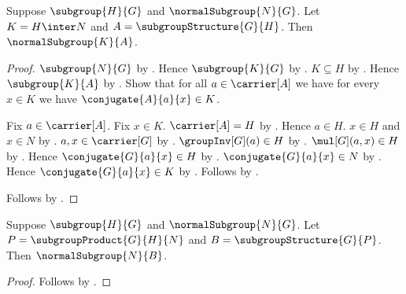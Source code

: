 \begin{theorem}\label{group_second_isomorphism_intersection_normal}
    Suppose $\subgroup{H}{G}$ and $\normalSubgroup{N}{G}$.
    Let $K=H\inter N$ and $A=\subgroupStructure{G}{H}$.
    Then $\normalSubgroup{K}{A}$.
\end{theorem}
\begin{proof}
    $\subgroup{N}{G}$ by .
    Hence $\subgroup{K}{G}$ by .
    $K\subseteq H$ by .
    Hence $\subgroup{K}{A}$ by
        .
    Show that for all $a\in\carrier[A]$ we have for every $x\in K$
        we have $\conjugate{A}{a}{x}\in K$.
    \begin{subproof}
        Fix $a\in\carrier[A]$.
        Fix $x\in K$.
        $\carrier[A]=H$ by .
        Hence $a\in H$.
        $x\in H$ and $x\in N$ by
            .
        $a,x\in\carrier[G]$ by
            .
        $\groupInv[G](a)\in H$ by .
        $\mul[G](a,x)\in H$ by .
        Hence $\conjugate{G}{a}{x}\in H$ by
            .
        $\conjugate{G}{a}{x}\in N$ by
            .
        Hence $\conjugate{G}{a}{x}\in K$ by .
        Follows by .
    \end{subproof}
    Follows by .
\end{proof}

\begin{theorem}\label{group_second_isomorphism_product_normal}
    Suppose $\subgroup{H}{G}$ and $\normalSubgroup{N}{G}$.
    Let $P=\subgroupProduct{G}{H}{N}$ and
        $B=\subgroupStructure{G}{P}$.
    Then $\normalSubgroup{N}{B}$.
\end{theorem}
\begin{proof}
    Follows by .
\end{proof}

